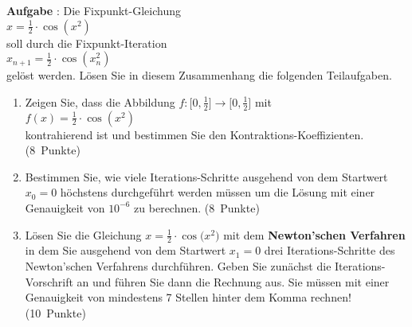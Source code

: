 \documentclass{article}
\newcounter{aufgabe}
\newcommand{\exercise}{\vspace*{0.3cm}
\stepcounter{aufgabe}

\noindent
\textbf{Aufgabe \arabic{aufgabe}}: }
\newcommand{\punkte}[1]{\hspace*{\fill} \mbox{(#1 Punkte)}}
\newcommand{\ds}{\displaystyle}
\begin{document}
\exercise
Die Fixpunkt-Gleichung
\\[0.2cm]
\hspace*{1.3cm}
$\ds x = \frac{1}{2} \cdot \cos(x^2)$  
\\[0.2cm]
soll  durch  die Fixpunkt-Iteration 
\\[0.2cm]
\hspace*{1.3cm}
$\ds x_{n+1} = \frac{1}{2} \cdot \cos(x_n^2)$ 
\\[0.1cm]
gel\"ost werden.  L\"osen Sie in diesem Zusammenhang die folgenden Teilaufgaben.
\begin{enumerate}
\item Zeigen Sie, dass die Abbildung $f:\bigl[0,\frac{1}{2}\bigr] \rightarrow
  \bigl[0,\frac{1}{2}\bigr]$ mit
      \\[0.2cm]
      \hspace*{1.3cm}
       $f(x) = \frac{1}{2}\cdot\cos(x^2)$ 
      \\[0.2cm]
      kontrahierend ist und bestimmen Sie den Kontraktions-Koeffizienten.
      \punkte{8}
\item Bestimmen Sie, wie viele Iterations-Schritte ausgehend von dem Startwert $x_0 = 0$
      h\"ochstens durchgef\"uhrt werden m\"ussen um die L\"osung mit einer Genauigkeit von $10^{-6}$
      zu berechnen.
      \punkte{8}
\item L\"osen Sie die Gleichung $x = \frac{1}{2}\cdot\cos\bigl(x^2\bigr)$ mit
      dem \textbf{Newton'schen Verfahren} in dem Sie ausgehend von dem Startwert $x_1 = 0$ 
      drei Iterations-Schritte des Newton'schen Verfahrens durchf\"uhren.
      Geben Sie zun\"achst die Iterations-Vorschrift an und f\"uhren Sie dann die Rechnung aus.
      Sie m\"ussen mit einer Genauigkeit von mindestens 7 Stellen hinter dem Komma rechnen!
      \punkte{10}
\end{enumerate}
\end{document}
